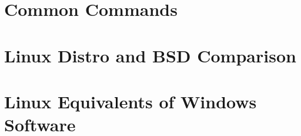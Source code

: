 \appendix

\chapter{Common Commands}

\chapter{Linux Distro and BSD Comparison}

\chapter{Linux Equivalents of Windows Software}


